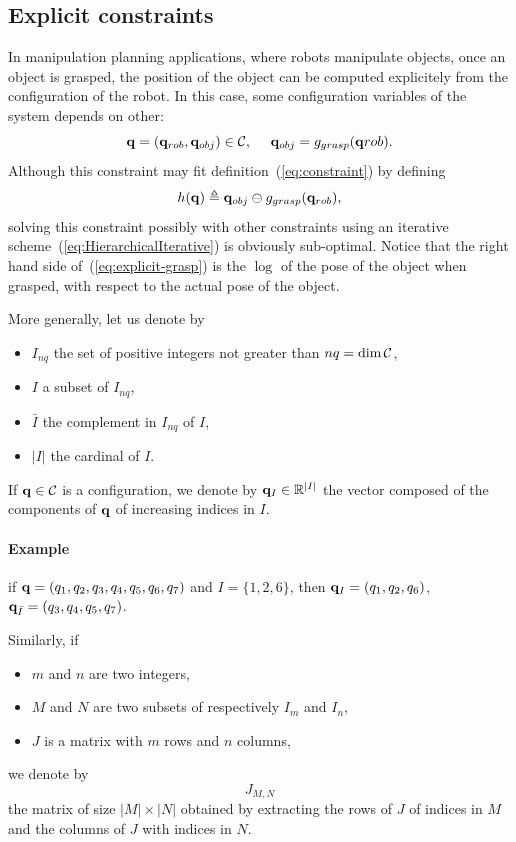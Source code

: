 \subsection{Explicit constraints}

In manipulation planning applications, where robots manipulate objects, once an object is grasped, the position of the object can be computed explicitely from the configuration of the robot. In this case, some configuration variables of the system depends on other:
$$
\conf=(\conf_{rob},\conf_{obj})\in\CS,\ \ \ \ \conf_{obj} = g_{grasp}(\conf{rob}).
$$
Although this constraint may fit definition~(\ref{eq:constraint}) by defining
\begin{equation}\label{eq:explicit-grasp}
h(\conf) \triangleq \conf_{obj} \ominus g_{grasp}(\conf_{rob}),
\end{equation}
solving this constraint possibly with other constraints using an iterative scheme~(\ref{eq:HierarchicalIterative}) is obviously sub-optimal.
Notice that the right hand side of~(\ref{eq:explicit-grasp}) is the $\log$ of the pose of the object when grasped, with respect to the actual pose of the object.

More generally, let us denote by
\begin {itemize}
\item $I_{nq}$ the set of positive integers not greater than $nq=\dim\mathcal{C}$,
\item $I$ a subset of $I_{nq}$,
\item $\bar{I}$ the complement in $I_{nq}$ of $I$,
\item $|I|$ the cardinal of $I$.
\end {itemize}
If $\mathbf{q}\in\mathcal{C}$ is a configuration, we denote by $\mathbf{q}_{I}\in\mathbb{R}^{|I|}$ the vector composed of the components of $\mathbf{q}$ of increasing indices in $I$.
\paragraph {Example} if $\mathbf{q} = (q_1,q_2,q_3,q_4,q_5,q_6,q_7)$ and $I=\{1,2,6\}$, then $\mathbf{q}_I=(q_1,q_2,q_6)$, $\mathbf{q}_{\bar{I}}=(q_3,q_4,q_5,q_7)$.

Similarly, if
\begin{itemize}
\item $m$ and $n$ are two integers,
\item $M$ and $N$ are two subsets of respectively $I_{m}$ and $I_{n}$,
\item $J$ is a matrix with $m$ rows and $n$ columns,
\end{itemize}
we denote by
\begin{equation}\label{eq:sub-matrix}
  J_{M,N}
\end{equation}
the matrix of size $|M| \times |N|$ obtained by extracting the rows of $J$ of indices in $M$ and the columns of $J$ with indices in $N$.

